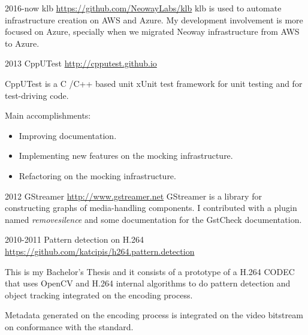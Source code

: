 \documentclass[]{friggeri-cv} %
\begin{document}
\begin{entrylist}
\entry
{2016-now}
{klb}
{\href{https://github.com/NeowayLabs/klb}{https://github.com/NeowayLabs/klb}}
{
    klb is used to automate infrastructure creation on AWS and Azure.
    My development involvement is more focused on Azure, specially when
    we migrated Neoway infrastructure from AWS to Azure.
}
\end{entrylist}

\begin{entrylist}
\entry
{2013}
{CppUTest}
{\href{http://cpputest.github.io}{http://cpputest.github.io}}
{
CppUTest is a C /C++ based unit xUnit test framework for unit testing and for test-driving code.

Main accomplishments:\\
\begin{itemize}
\item Improving documentation.
\item Implementing new features on the mocking infrastructure.
\item Refactoring on the mocking infrastructure.
\end{itemize}
}
\end{entrylist}

\begin{entrylist}
\entry
{2012}
{GStreamer}
{\href{http://www.gstreamer.net}{http://www.gstreamer.net}}
{
GStreamer is a library for constructing graphs of
media-handling components. I contributed with a plugin
named \emph{removesilence} and some documentation for the
GstCheck documentation.
}
\end{entrylist}

\begin{entrylist}
\entry
{2010-2011}
{Pattern detection on H.264}
{\href{https://github.com/katcipis/h264.pattern.detection}{https://github.com/katcipis/h264.pattern.detection}}
{
This is my Bachelor's Thesis and it consists of a prototype
of a H.264 CODEC that uses OpenCV and H.264 internal
algorithms to do pattern detection and
object tracking integrated on the encoding process.

Metadata generated on the encoding process is integrated on
the video bitstream on conformance with the standard.
}
\end{entrylist}

\end{document}
